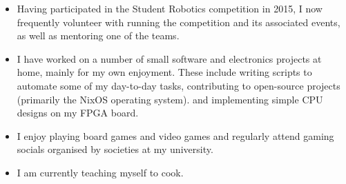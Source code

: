 
\begin{itemize}
  \item Having participated in the Student Robotics competition in 2015, I now frequently volunteer with running the competition and its associated events, as well as mentoring one of the teams.
  \item I have worked on a number of small software and electronics projects at home, mainly for my own enjoyment. These include writing scripts to automate some of my day-to-day tasks, contributing to open-source projects (primarily the NixOS operating system). and implementing simple CPU designs on my FPGA board.
  \item I enjoy playing board games and video games and regularly attend gaming socials organised by societies at my university.
  \item I am currently teaching myself to cook.
\end{itemize}
